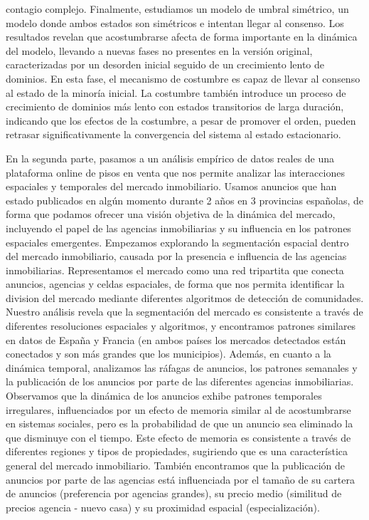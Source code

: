 contagio complejo. Finalmente, estudiamos un modelo de umbral simétrico, un modelo donde ambos estados son simétricos e intentan llegar al consenso. Los resultados revelan que acostumbrarse afecta de forma importante en la dinámica del modelo, llevando a nuevas fases no presentes en la versión original, caracterizadas por un desorden inicial seguido de un crecimiento lento de dominios. En esta fase, el mecanismo de costumbre es capaz de llevar al consenso al estado de la minoría inicial. La costumbre también introduce un proceso de crecimiento de dominios más lento con estados transitorios de larga duración, indicando que los efectos de la costumbre, a pesar de promover el orden, pueden retrasar significativamente la convergencia del sistema al estado estacionario.

En la segunda parte, pasamos a un análisis empírico de datos reales de una plataforma online de pisos en venta que nos permite analizar las interacciones espaciales y temporales del mercado inmobiliario. Usamos anuncios que han estado publicados en algún momento durante 2 años en 3 provincias españolas, de forma que podamos ofrecer una visión objetiva de la dinámica del mercado, incluyendo el papel de las agencias inmobiliarias y su influencia en los patrones espaciales emergentes. Empezamos explorando la segmentación espacial dentro del mercado inmobiliario, causada por la presencia e influencia de las agencias inmobiliarias. Representamos el mercado como una red tripartita que conecta anuncios, agencias y celdas espaciales, de forma que nos permita identificar la division del mercado mediante diferentes algoritmos de detección de comunidades. Nuestro análisis revela que la segmentación del mercado es consistente a través de diferentes resoluciones espaciales y algoritmos, y encontramos patrones similares en datos de España y Francia (en ambos países los mercados detectados están conectados y son más grandes que los municipios). Además, en cuanto a la dinámica temporal, analizamos las ráfagas de anuncios, los patrones semanales y la publicación de los anuncios por parte de las diferentes agencias inmobiliarias. Observamos que la dinámica de los anuncios exhibe patrones temporales irregulares, influenciados por un efecto de memoria similar al de acostumbrarse en sistemas sociales, pero es la probabilidad de que un anuncio sea eliminado la que disminuye con el tiempo. Este efecto de memoria es consistente a través de diferentes regiones y tipos de propiedades, sugiriendo que es una característica general del mercado inmobiliario. También encontramos que la publicación de anuncios por parte de las agencias está influenciada por el tamaño de su cartera de anuncios (preferencia por agencias grandes), su precio medio (similitud de precios agencia - nuevo casa) y su proximidad espacial (especialización).

